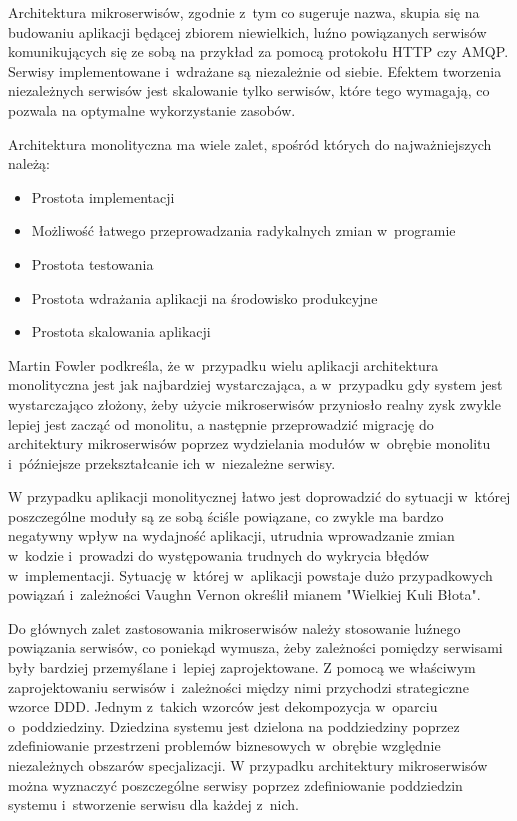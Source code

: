 \par
Architektura mikroserwisów, zgodnie z~tym co sugeruje nazwa, skupia się na budowaniu aplikacji będącej zbiorem niewielkich,
luźno powiązanych serwisów komunikujących się ze sobą na przykład za pomocą protokołu HTTP czy AMQP.
Serwisy implementowane i~wdrażane są niezależnie od siebie\cite{book:dot-net-microservices}.
Efektem tworzenia niezależnych serwisów jest skalowanie tylko serwisów, które tego wymagają,
co pozwala na optymalne wykorzystanie zasobów\cite{book:mastering-microservices-with-java9}.

\par
Architektura monolityczna ma wiele zalet\cite{book:microservices-patterns}, spośród których do najważniejszych należą:
\begin{itemize}
    \item Prostota implementacji
    \item Możliwość łatwego przeprowadzania radykalnych zmian w~programie
    \item Prostota testowania
    \item Prostota wdrażania aplikacji na środowisko produkcyjne
    \item Prostota skalowania aplikacji
\end{itemize}

\par
Martin Fowler podkreśla, że w~przypadku wielu aplikacji architektura monolityczna jest jak najbardziej wystarczająca,
a w~przypadku gdy system jest wystarczająco złożony, żeby użycie mikroserwisów przyniosło realny zysk zwykle lepiej jest zacząć od monolitu,
a następnie przeprowadzić migrację do architektury mikroserwisów poprzez wydzielania modułów w~obrębie monolitu
i~późniejsze przekształcanie ich w~niezależne serwisy\cite{url:monolith-first}.

\par
W przypadku aplikacji monolitycznej łatwo jest doprowadzić do sytuacji w~której poszczególne moduły są ze sobą ściśle powiązane,
co zwykle ma bardzo negatywny wpływ na wydajność aplikacji, utrudnia wprowadzanie zmian w~kodzie i~prowadzi do występowania trudnych do wykrycia błędów w~implementacji.
Sytuację w~której w~aplikacji powstaje dużo przypadkowych powiązań i~zależności Vaughn Vernon określił mianem "Wielkiej Kuli Błota"\cite{book:ddd-kompendium}.

\par
Do głównych zalet zastosowania mikroserwisów należy stosowanie luźnego powiązania serwisów,
co poniekąd wymusza, żeby zależności pomiędzy serwisami były bardziej przemyślane i~lepiej zaprojektowane.
Z pomocą we właściwym zaprojektowaniu serwisów i~zależności między nimi przychodzi strategiczne wzorce DDD.
Jednym z~takich wzorców jest dekompozycja w~oparciu o~poddziedziny\cite{book:ddd-evans}.
Dziedzina systemu jest dzielona na poddziedziny poprzez zdefiniowanie przestrzeni problemów biznesowych w~obrębie względnie niezależnych obszarów specjalizacji.
W przypadku architektury mikroserwisów można wyznaczyć poszczególne serwisy poprzez zdefiniowanie poddziedzin systemu
i~stworzenie serwisu dla każdej z~nich\cite{book:microservices-patterns}.

